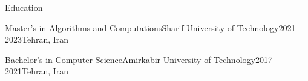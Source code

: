 \begin{section}{Education}
    \begin{subsectionnobullet}{Master’s in Algorithms and Computations}{Sharif University of Technology}{2021 -- 2023}{Tehran, Iran}
    \end{subsectionnobullet}
    \begin{subsectionnobullet}{Bachelor’s in Computer Science}{Amirkabir University of Technology}{2017 -- 2021}{Tehran, Iran}
    \end{subsectionnobullet}
\end{section}



